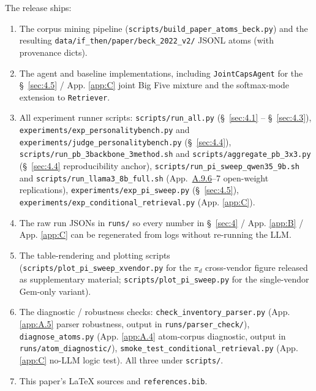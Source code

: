 The release ships:
\begingroup\raggedright
\begin{enumerate}
\item The corpus mining pipeline (\texttt{scripts/\allowbreak{}build\_\allowbreak{}paper\_\allowbreak{}atoms\_\allowbreak{}beck.py}) and the resulting \texttt{data/\allowbreak{}if\_\allowbreak{}then/\allowbreak{}paper/\allowbreak{}beck\_\allowbreak{}2022\_\allowbreak{}v2/\allowbreak{}} JSONL atoms (with provenance dicts).
\item The agent and baseline implementations, including \texttt{JointCapsAgent} for the \S~\ref{sec:4.5} / App. \ref{app:C} joint Big Five mixture and the softmax-mode extension to \texttt{Retriever}.
\item All experiment runner scripts: \texttt{scripts/\allowbreak{}run\_\allowbreak{}all.py} (\S~\ref{sec:4.1} -- \S~\ref{sec:4.3}), \texttt{experiments/\allowbreak{}exp\_\allowbreak{}personalitybench.py} and \texttt{experiments/\allowbreak{}judge\_\allowbreak{}personalitybench.py} (\S~\ref{sec:4.4}), \texttt{scripts/\allowbreak{}run\_\allowbreak{}pb\_\allowbreak{}3backbone\_\allowbreak{}3method.sh} and \texttt{scripts/\allowbreak{}aggregate\_\allowbreak{}pb\_\allowbreak{}3x3.py} (\S~\ref{sec:4.4} reproducibility anchor), \texttt{scripts/\allowbreak{}run\_\allowbreak{}pi\_\allowbreak{}sweep\_\allowbreak{}qwen35\_\allowbreak{}9b.sh} and \texttt{scripts/\allowbreak{}run\_\allowbreak{}llama3\_\allowbreak{}8b\_\allowbreak{}full.sh} (App.~\hyperref[app:A.9.6]{A.9.6}--7 open-weight replications), \texttt{experiments/\allowbreak{}exp\_\allowbreak{}pi\_\allowbreak{}sweep.py} (\S~\ref{sec:4.5}), \texttt{experiments/\allowbreak{}exp\_\allowbreak{}conditional\_\allowbreak{}retrieval.py} (App. \ref{app:C}).
\item The raw run JSONs in \texttt{runs/\allowbreak{}} so every number in \S~\ref{sec:4} / App. \ref{app:B} / App. \ref{app:C} can be regenerated from logs without re-running the LLM.
\item The table-rendering and plotting scripts (\texttt{scripts/\allowbreak{}plot\_\allowbreak{}pi\_\allowbreak{}sweep\_\allowbreak{}xvendor.py} for the $\pi_d$ cross-vendor figure released as supplementary material; \texttt{scripts/\allowbreak{}plot\_\allowbreak{}pi\_\allowbreak{}sweep.py} for the single-vendor Gem-only variant).
\item The diagnostic / robustness checks: \texttt{check\_\allowbreak{}inventory\_\allowbreak{}parser.py} (App. \ref{app:A.5} parser robustness, output in \texttt{runs/\allowbreak{}parser\_\allowbreak{}check/\allowbreak{}}), \texttt{diagnose\_\allowbreak{}atoms.py} (App. \ref{app:A.4} atom-corpus diagnostic, output in \texttt{runs/\allowbreak{}atom\_\allowbreak{}diagnostic/\allowbreak{}}), \texttt{smoke\_\allowbreak{}test\_\allowbreak{}conditional\_\allowbreak{}retrieval.py} (App. \ref{app:C} no-LLM logic test). All three under \texttt{scripts/\allowbreak{}}.
\item This paper's LaTeX sources and \texttt{references.bib}.
\end{enumerate}
\endgroup

